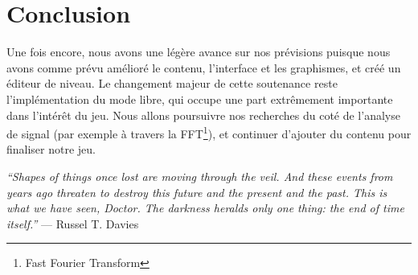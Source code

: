 \documentclass[12pt,a4paper]{article}
\begin{document}
\section{Conclusion}
Une fois encore, nous avons une légère avance sur nos prévisions puisque nous avons comme prévu amélioré le contenu, l'interface et les graphismes, et créé un éditeur de niveau. Le changement majeur de cette soutenance reste l'implémentation du mode libre, qui occupe une part extrêmement importante dans l'intérêt du jeu. Nous allons poursuivre nos recherches du coté de l'analyse de signal (par exemple à travers la FFT\footnote{Fast Fourier Transform}), et continuer d'ajouter du contenu pour finaliser notre jeu.
\vspace{1.5cm}
\par
\emph{``Shapes of things once lost are moving through the veil. And these events from years ago threaten to destroy this future and the present and the past. This is what we have seen, Doctor. The darkness heralds only one thing: the end of time itself.''} --- Russel T. Davies
\end{document}
